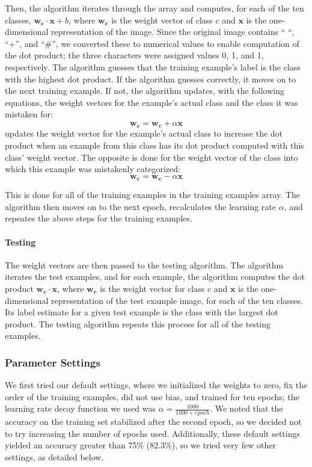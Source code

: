 Then, the algorithm iterates through the array and computes, for each of the ten classes, $\mathbf{w_c} \cdot \mathbf{x} + b$, where $\mathbf{w_c}$ is the weight vector of class $c$ and $\mathbf{x}$ is the one-dimensional representation of the image. Since the original image contains `` ``, ``+'', and ``\#'', we converted these to numerical values to enable computation of the dot product; the three characters were assigned values 0, 1, and 1, respectively. The algorithm guesses that the training example's label is the class with the highest dot product. If the algorithm guesses correctly, it moves on to the next training example. If not, the algorithm updates, with the following equations, the weight vectors for the example's actual class and the class it was mistaken for:
\begin{equation}
\mathbf{w_c} = \mathbf{w_c} + \alpha{}\mathbf{x}
\end{equation}
updates the weight vector for the example's actual class to increase the dot product when an example from this class has its dot product computed with this class' weight vector. The opposite is done for the weight vector of the class into which this example was mistakenly categorized:
\begin{equation}
\mathbf{w_c} = \mathbf{w_c} - \alpha{}\mathbf{x}
\end{equation}

This is done for all of the training examples in the training examples array. The algorithm then moves on to the next epoch, recalculates the learning rate $\alpha$, and repeates the above steps for the training examples.

\paragraph{Testing}
The weight vectors are then passed to the testing algorithm. The algorithm iterates the test examples, and for each example, the algorithm computes the dot product $\mathbf{w_c} \cdot \mathbf{x}$, where $\mathbf{w_c}$ is the weight vector for class $c$ and $\mathbf{x}$ is the one-dimensional representation of the test example image, for each of the ten classes. Its label estimate for a given test example is the class with the largest dot product. The testing algorithm repeats this process for all of the testing examples.


\subsubsection{Parameter Settings}
We first tried our default settings, where we initialized the weights to zero, fix the order of the training examples, did not use bias, and trained for ten epochs; the learning rate decay function we used was $\alpha = \frac{1000}{10
00+epoch}$. We noted that the accuracy on the training set stabilized after the second epoch, so we decided not to try increasing the number of epochs used. Additionally, these default settings yielded an accuracy greater than 75\% (82.3\%), so we tried very few other settings, as detailed below.

